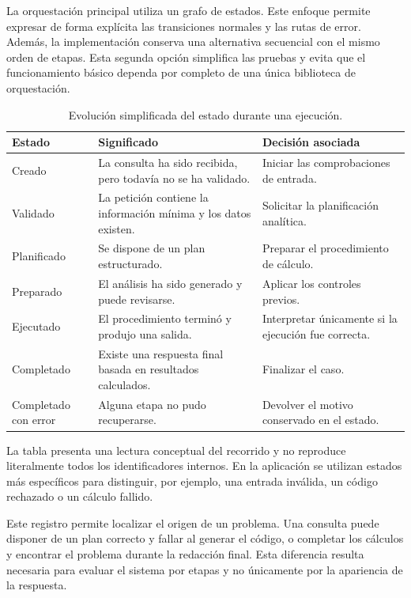 La orquestación principal utiliza un grafo de estados. Este enfoque permite expresar de forma explícita las transiciones normales y las rutas de error. Además, la implementación conserva una alternativa secuencial con el mismo orden de etapas. Esta segunda opción simplifica las pruebas y evita que el funcionamiento básico dependa por completo de una única biblioteca de orquestación.

\begin{table}[H]
\centering
\small
\begin{tabularx}{\textwidth}{L{0.24\textwidth}L{0.30\textwidth}Y}
\toprule
\textbf{Estado} & \textbf{Significado} & \textbf{Decisión asociada} \\
\midrule
Creado & La consulta ha sido recibida, pero todavía no se ha validado. & Iniciar las comprobaciones de entrada. \\
Validado & La petición contiene la información mínima y los datos existen. & Solicitar la planificación analítica. \\
Planificado & Se dispone de un plan estructurado. & Preparar el procedimiento de cálculo. \\
Preparado & El análisis ha sido generado y puede revisarse. & Aplicar los controles previos. \\
Ejecutado & El procedimiento terminó y produjo una salida. & Interpretar únicamente si la ejecución fue correcta. \\
Completado & Existe una respuesta final basada en resultados calculados. & Finalizar el caso. \\
Completado con error & Alguna etapa no pudo recuperarse. & Devolver el motivo conservado en el estado. \\
\bottomrule
\end{tabularx}
\caption{Evolución simplificada del estado durante una ejecución.}
\label{tab:estados_implementacion}
\end{table}

La tabla presenta una lectura conceptual del recorrido y no reproduce literalmente todos los identificadores internos. En la aplicación se utilizan estados más específicos para distinguir, por ejemplo, una entrada inválida, un código rechazado o un cálculo fallido.

Este registro permite localizar el origen de un problema. Una consulta puede disponer de un plan correcto y fallar al generar el código, o completar los cálculos y encontrar el problema durante la redacción final. Esta diferencia resulta necesaria para evaluar el sistema por etapas y no únicamente por la apariencia de la respuesta.

